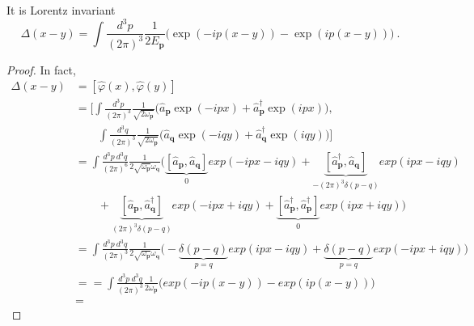     It is Lorentz invariant
    \begin{equation*}
        \Delta (x - y) = \int \frac{d^3 p}{(2 \pi)^3} \frac{1}{2 E_{\mathbf p}} \Big ( \exp(- i p (x - y)) - \exp(i p (x - y)) \Big) ~.
    \end{equation*}
    \begin{proof}
        In fact, 
        \begin{equation*}
        \begin{aligned}
            \Delta (x - y) & = [\hat \varphi (x), \hat \varphi (y)] \\ & = [\int \frac{d^3 p}{{(2\pi)}^3} \frac{1}{\sqrt{2 \omega_{\mathbf p}}} \Big (\hat a_{\mathbf p} \exp(- i p x) + \hat a_{\mathbf p}^\dagger \exp(i p x) \Big) , \\ & \qquad  \int \frac{d^3 q}{{(2\pi)}^3} \frac{1}{\sqrt{2 \omega_{\mathbf p}}} \Big (\hat a_{\mathbf q} \exp(- i q y) + \hat a_{\mathbf q}^\dagger \exp( i q y) \Big)] \\ & = \int \frac{d^3 p ~ d^3 q}{{(2\pi)}^6} \frac{1}{2 \sqrt{\omega_{\mathbf p}}\omega_{\mathbf q}}  \Big ( \underbrace{[\hat a_{\mathbf p}, \hat a_{\mathbf q}]}_0 exp (- i p x - i q y) + \underbrace{[\hat a_{\mathbf p}^\dagger, \hat a_{\mathbf q}]}_{- (2\pi)^3 \delta (p - q)} exp (i p x - i q y) \\ & \qquad + \underbrace{[\hat a_{\mathbf p}, \hat a_{\mathbf q}^\dagger]}_{(2\pi)^3 \delta ( p - q)} exp (- i p x + i q y) + \underbrace{[\hat a_{\mathbf p}^\dagger, \hat a_{\mathbf p}^\dagger]}_0 exp (i p x + i q y) \Big) \\ & = \int \frac{d^3 p ~ d^3 q}{{(2\pi)}^3} \frac{1}{2 \sqrt{\omega_{\mathbf p}}\omega_{\mathbf q}}  \Big ( - \underbrace{\delta (p - q)}_{p = q} exp (i p x - i q y) + \underbrace{\delta ( p - q)}_{p = q} exp (- i p x + i q y) \Big) \\ & =  = \int \frac{d^3 p ~ d^3 q}{{(2\pi)}^3} \frac{1}{2 \omega_{\mathbf p}} \Big ( exp (- i p (x -  y)) - exp (i p (x - y) )  \Big) \\ & =
        \end{aligned}
        \end{equation*}
    \end{proof}


